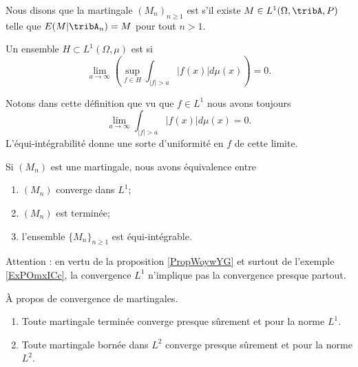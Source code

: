 \begin{definition}
    Nous disons que la martingale \( (M_n)_{n\geq 1}\) est  s'il existe \( M\in L^1(\Omega,\tribA,P)\) telle que \( E(M|\tribA_n)=M\) pour tout \( n>1\).
\end{definition}

\begin{definition}  \label{DefOZlZnse}
    Un ensemble \( H\subset L^1(\Omega,\mu)\) est  si
    \begin{equation}
        \lim_{a\to \infty}\left( \sup_{f\in H}\int_{  | f |>a   }| f(x) |d\mu(x) \right)=0.
    \end{equation}
\end{definition}
Notons dans cette définition que vu que \( f\in L^1\) nous avons toujours
\begin{equation}
    \lim_{a\to \infty}\int_{| f |>a}| f(x) |d\mu(x)=0.
\end{equation}
L'équi-intégrabilité donne une sorte d'uniformité en \( f\) de cette limite.

\begin{theorem} \label{ThoEFbpVXb}
    Si \( (M_n)\) est une martingale, nous avons équivalence entre
    \begin{enumerate}
        \item
            \( (M_n)\) converge dans \( L^1\);
        \item
            \( (M_n)\) est terminée;
        \item
            l'ensemble \( \{ M_n \}_{n\geq 1}\) est équi-intégrable.
    \end{enumerate}
\end{theorem}

Attention : en vertu de la proposition \ref{PropWoywYG} et surtout de l'exemple \ref{ExPOmxICc}, la convergence \( L^1\) n'implique pas la convergence presque partout.

\begin{theorem}   \label{ThoHBvnTRk}
    À propos de convergence de martingales.
    \begin{enumerate}
        \item
            Toute martingale terminée converge presque sûrement et pour la norme \( L^1\).
        \item
            Toute martingale bornée dans \( L^2\) converge presque sûrement et pour la norme \( L^2\).
    \end{enumerate}
\end{theorem}


